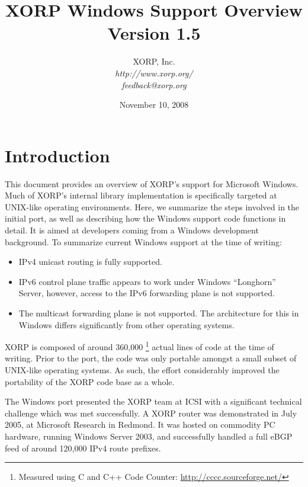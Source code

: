 \documentclass[11pt]{article}
\begin{document}
\title{XORP Windows Support Overview \\
\vspace{1ex}
Version 1.5}
\author{ XORP, Inc.					\\
         {\it http://www.xorp.org/}			\\
	 {\it feedback@xorp.org}
}
\date{November 10, 2008}

\maketitle


\section{Introduction}

This document provides an overview of XORP's support for Microsoft Windows.
Much of XORP's internal library implementation is specifically targeted
at UNIX-like operating environments. Here, we summarize the steps involved
in the initial port, as well as describing how the Windows support code
functions in detail. It is aimed at developers coming from a Windows
development background.
To summarize current Windows support at the time of writing:
\begin{itemize}
 \item IPv4 unicast routing is fully supported.
 \item IPv6 control plane traffic appears to work under Windows
``Longhorn'' Server, however, access to the IPv6 forwarding plane
is not supported.
 \item The multicast forwarding plane is not supported. The architecture
for this in Windows differs significantly from other operating systems.
\end{itemize}

XORP is composed of around 360,000
\footnote{Measured using C and C++ Code Counter: \url{http://cccc.sourceforge.net/}}
actual lines of code at the time of writing.
Prior to the port, the code was only portable amongst
a small subset of UNIX-like operating systems. As such, the effort
considerably improved the portability of the XORP code base as a whole.

The Windows port presented the XORP team at ICSI with a significant technical
challenge which was met successfully.
A XORP router  was
demonstrated in July 2005, at Microsoft Research in Redmond.
It was hosted on commodity PC hardware, running Windows Server 2003,
and successfully handled a full eBGP feed of around 120,000 IPv4 route prefixes.
\end{document}
